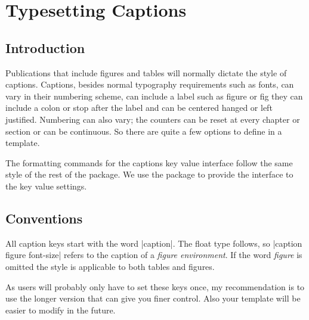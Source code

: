 \chapter{Typesetting Captions}
\section{Introduction}

Publications that include figures and tables will normally dictate
the style of captions. Captions, besides normal typography 
requirements such as fonts, can vary in their numbering scheme, can
include a label such as figure or fig they can include a colon or stop
after the label and can be centered hanged or left justified. 
Numbering can also vary; the counters can be reset at every chapter or section or can be continuous. So
there are quite a few options to define in a template.

The formatting commands for the captions key value interface follow the same style of the rest of the package. We use the  package to provide the interface to the key value settings.


\section{Conventions}

All caption keys start with the word |caption|. The float type follows, so |caption figure font-size| refers to the caption of a \textit{figure environment}. If the word \textit{figure} is omitted the style is applicable to both tables and figures. 

As users will probably only have to set these keys once, my recommendation is to use the longer version that can give you finer control. Also your template will be easier to modify in the future.
\medskip

